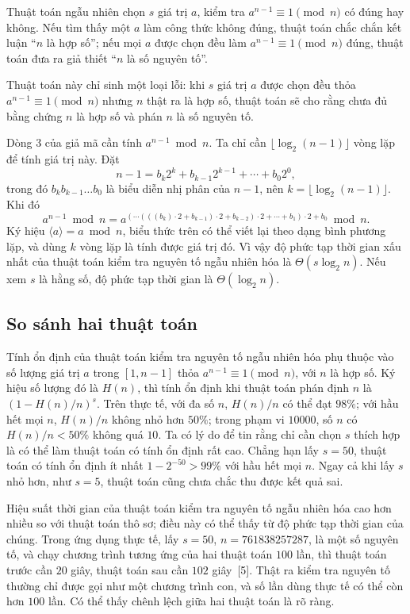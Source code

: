\documentclass[11pt]{article}
\begin{document}
Thuật toán ngẫu nhiên chọn \(s\) giá trị \(a\), kiểm tra
\(a^{n-1}\equiv1\pmod n\) có đúng hay không. Nếu tìm thấy một \(a\) làm công
thức không đúng, thuật toán chắc chắn kết luận ``\(n\) là hợp số''; nếu mọi
\(a\) được chọn đều làm \(a^{n-1}\equiv1\pmod n\) đúng, thuật toán đưa ra giả
thiết ``\(n\) là số nguyên tố''.

Thuật toán này chỉ sinh một loại lỗi: khi \(s\) giá trị \(a\) được chọn đều
thỏa \(a^{n-1}\equiv1\pmod n\) nhưng \(n\) thật ra là hợp số, thuật toán sẽ
cho rằng chưa đủ bằng chứng \(n\) là hợp số và phán \(n\) là số nguyên tố.

Dòng 3 của giả mã cần tính \(a^{n-1}\bmod n\). Ta chỉ cần
\(\lfloor\log_2(n-1)\rfloor\) vòng lặp để tính giá trị này. Đặt
\[
  n-1=b_k2^k+b_{k-1}2^{k-1}+\cdots+b_0 2^0,
\]
trong đó \(b_kb_{k-1}\ldots b_0\) là biểu diễn nhị phân của \(n-1\), nên
\(k=\lfloor\log_2(n-1)\rfloor\). Khi đó
\[
  a^{n-1}\bmod n
  = a^{(\cdots(((b_k)\cdot2+b_{k-1})\cdot2+b_{k-2})\cdot2+\cdots+b_1)\cdot2+b_0}
    \bmod n.
\]
Ký hiệu \(\langle a\rangle=a\bmod n\), biểu thức trên có thể viết lại theo
dạng bình phương lặp, và dùng \(k\) vòng lặp là tính được giá trị đó. Vì vậy
độ phức tạp thời gian xấu nhất của thuật toán kiểm tra nguyên tố ngẫu nhiên
hóa là \(\Theta(s\log_2 n)\). Nếu xem \(s\) là hằng số, độ phức tạp thời gian
là \(\Theta(\log_2 n)\).

\subsection{So sánh hai thuật toán}

Tính ổn định của thuật toán kiểm tra nguyên tố ngẫu nhiên hóa phụ thuộc vào
số lượng giá trị \(a\) trong \([1,n-1]\) thỏa \(a^{n-1}\equiv1\pmod n\), với
\(n\) là hợp số. Ký hiệu số lượng đó là \(H(n)\), thì tính ổn định khi thuật
toán phán định \(n\) là \((1-H(n)/n)^s\). Trên thực tế, với đa số \(n\),
\(H(n)/n\) có thể đạt \(98\%\); với hầu hết mọi \(n\), \(H(n)/n\) không nhỏ
hơn \(50\%\); trong phạm vi \(10000\), số \(n\) có \(H(n)/n<50\%\) không quá
\(10\). Ta có lý do để tin rằng chỉ cần chọn \(s\) thích hợp là có thể làm
thuật toán có tính ổn định rất cao. Chẳng hạn lấy \(s=50\), thuật toán có
tính ổn định ít nhất \(1-2^{-50}>99\%\) với hầu hết mọi \(n\). Ngay cả khi
lấy \(s\) nhỏ hơn, như \(s=5\), thuật toán cũng chưa chắc thu được kết quả
sai.

Hiệu suất thời gian của thuật toán kiểm tra nguyên tố ngẫu nhiên hóa cao hơn
nhiều so với thuật toán thô sơ; điều này có thể thấy từ độ phức tạp thời gian
của chúng. Trong ứng dụng thực tế, lấy \(s=50\), \(n=761838257287\), là một số
nguyên tố, và chạy chương trình tương ứng của hai thuật toán \(100\) lần, thì
thuật toán trước cần \(20\) giây, thuật toán sau cần \(102\) giây~[5]. Thật ra
kiểm tra nguyên tố thường chỉ được gọi như một chương trình con, và số lần
dùng thực tế có thể còn hơn \(100\) lần. Có thể thấy chênh lệch giữa hai thuật
toán là rõ ràng.
\end{document}
